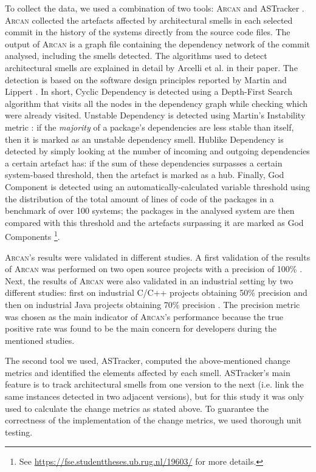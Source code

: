 To collect the data, we used a combination of two tools: \textsc{Arcan} \cite{Arcelli2016} and ASTracker \cite{Sas2019}. \textsc{Arcan} collected the artefacts affected by architectural smells in each selected commit in the history of the systems directly from the source code files.
The output of \textsc{Arcan} is a graph file containing the dependency network of the commit analysed, including the smells detected.
The algorithms used to detect architectural smells are explained in detail by Arcelli et al. in their paper\cite{Arcelli2016}. The detection is based on the software design principles reported by Martin \cite{Martin2018} and Lippert \cite{Lippert2006}.
In short, Cyclic Dependency is detected using a Depth-First Search algorithm that visits all the nodes in the dependency graph while checking which were already visited. 
Unstable Dependency is detected using Martin's Instability metric \cite{Martin2018}: if the \emph{majority} of a package's  dependencies are less stable than itself, then it is marked as an unstable dependency smell.
Hublike Dependency is detected by simply looking at the number of incoming and outgoing dependencies a certain artefact has: if the sum of these dependencies surpasses a certain system-based threshold, then the artefact is marked as a hub.
Finally, God Component is detected using an automatically-calculated variable threshold \cite{Arcelli2015} using the distribution of the total amount of lines of code of the packages in a benchmark of over 100 systems; the packages in the analysed system are then compared with this threshold and the artefacts surpassing it are marked as God Components \footnote{See \url{https://fse.studenttheses.ub.rug.nl/19603/} for more details.}.

\textsc{Arcan}'s results were validated in different studies. A first validation of the results of \textsc{Arcan} was performed on two open source projects with a precision of 100\% \cite{Arcelli2016}. 
Next, the results of \textsc{Arcan} were also validated in an industrial setting by two different studies: first on industrial C/C++ projects obtaining 50\% precision \cite{Martini2018} and then on industrial Java projects obtaining 70\% precision \cite{Arcelli2020}.
The precision metric was chosen as the main indicator of \textsc{Arcan}'s performance because the true positive rate was found to be the main concern for developers during the mentioned studies.

The second tool we used, ASTracker, computed the above-mentioned change metrics and identified the elements affected by each smell.
ASTracker's main feature is to track architectural smells from one version to the next (i.e. link the same instances detected in two adjacent versions), but for this study it was only used to calculate the change metrics as stated above. To guarantee the correctness of the implementation of the change metrics, we used thorough unit testing.

